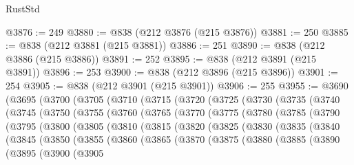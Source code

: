 \begin{lexlean}{RustStd}
\begin{coremodule}
{\begin{coremodule}
{{{{{{{{{{{{{{{{{{{{{{{{{{{{{{{{{{{{{{{{{{{{{{{{{{{{{{{@3876 := 249
@3880 := @838 (@212 @3876 (@215 @3876))
@3881 := 250
@3885 := @838 (@212 @3881 (@215 @3881))
@3886 := 251
@3890 := @838 (@212 @3886 (@215 @3886))
@3891 := 252
@3895 := @838 (@212 @3891 (@215 @3891))
@3896 := 253
@3900 := @838 (@212 @3896 (@215 @3896))
@3901 := 254
@3905 := @838 (@212 @3901 (@215 @3901))
@3906 := 255
@3955 := @3690
    (@3695
      (@3700
        (@3705
          (@3710
            (@3715
              (@3720
                (@3725
                  (@3730
                    (@3735
                      (@3740
                        (@3745
                          (@3750
                            (@3755
                              (@3760
                                (@3765
                                  (@3770
                                    (@3775
                                      (@3780
                                        (@3785
                                          (@3790
                                            (@3795
                                              (@3800
                                                (@3805
                                                  (@3810
                                                    (@3815
                                                      (@3820
                                                        (@3825
                                                          (@3830
                                                            (@3835
                                                              (@3840
                                                                (@3845
                                                                  (@3850
                                                                    (@3855
                                                                      (@3860
                                                                        (@3865
                                                                          (@3870
                                                                            (@3875
                                                                              (@3880
                                                                                (@3885
                                                                                  (@3890
                                                                                    (@3895
                                                                                      (@3900
                                                                                        (@3905
}}}}}}}}}}}}}}}}}}}}}}}}}}}}}}}}}}}}}}}}}}}}}}}}}}}}}}}
\end{coremodule}}
\end{coremodule}
\end{lexlean}
